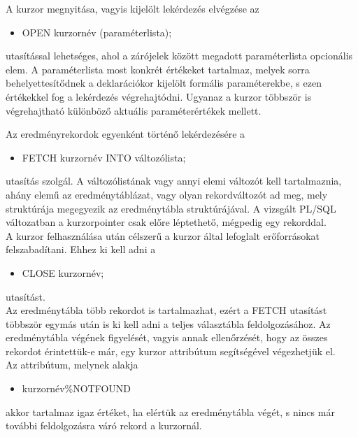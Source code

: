 \documentclass[tikz,12pt,margin=0px]{article}
\begin{document}
    \noindent A kurzor megnyitása, vagyis kijelölt lekérdezés elvégzése az
    \begin{itemize}
        \item OPEN kurzornév (paraméterlista);
    \end{itemize}
    utasítással lehetséges, ahol a zárójelek között megadott paraméterlista opcionális elem. A paraméterlista most konkrét értékeket tartalmaz, melyek sorra behelyettesítődnek a deklarációkor kijelölt formális paraméterekbe, s ezen értékekkel fog a lekérdezés végrehajtódni. Ugyanaz a kurzor többször is végrehajtható különböző aktuális paraméterértékek mellett.

    \noindent Az eredményrekordok egyenként történő lekérdezésére a
    \begin{itemize}
	   \item FETCH kurzornév INTO változólista;
    \end{itemize}
    utasítás szolgál. A változólistának vagy annyi elemi változót kell tartalmaznia, ahány elemű az eredménytáblázat, vagy olyan rekordváltozót ad meg, mely struktúrája megegyezik az eredménytábla struktúrájával. A vizsgált PL/SQL változatban a kurzorpointer csak előre léptethető, mégpedig egy rekorddal.\\

    \noindent A kurzor felhasználása után célszerű a kurzor által lefoglalt erőforrásokat felszabadítani. Ehhez ki kell adni a
    \begin{itemize}
        \item CLOSE kurzornév;
    \end{itemize}
    utasítást.\\

    \noindent Az eredménytábla több rekordot is tartalmazhat, ezért a FETCH utasítást többször egymás után is ki kell adni a teljes választábla feldolgozásához. Az eredménytábla végének figyelését, vagyis annak ellenőrzését, hogy az összes rekordot érintettük-e már, egy kurzor attribútum segítségével végezhetjük el.\\

    \noindent Az attribútum, melynek alakja
    \begin{itemize}
        \item kurzornév\%NOTFOUND
    \end{itemize}
    akkor tartalmaz igaz értéket, ha elértük az eredménytábla végét, s nincs már további feldolgozásra váró rekord a kurzornál.\\
\end{document}
